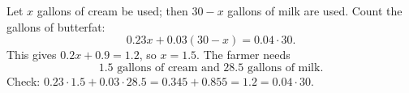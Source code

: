 Let $x$ gallons of cream be used; then $30-x$ gallons of milk are used. Count the gallons of butterfat:
\[
0.23x+0.03(30-x)=0.04\cdot30 .
\]
This gives $0.2x+0.9=1.2$, so $x=1.5$. The farmer needs
\[
\boxed{1.5\text{ gallons of cream and }28.5\text{ gallons of milk}}.
\]
Check: $0.23\cdot1.5+0.03\cdot28.5=0.345+0.855=1.2=0.04\cdot30$.
